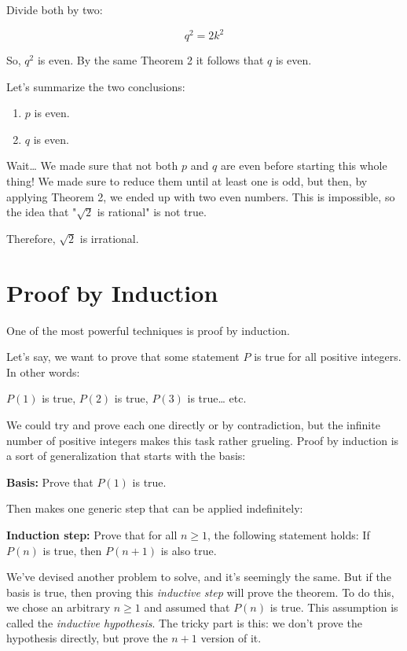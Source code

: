 \documentclass[12pt, a4paper, justified, notitlepage, sfsidenotes, notoc]{book}
\begin{document}
Divide both by two:

$$ q^2 = 2k^2 $$

So, \(q^2\) is even. By the same Theorem 2 it follows that \(q\) is even.

Let's summarize the two conclusions:

\begin{enumerate}
\item \(p\) is even.
\item \(q\) is even.
\end{enumerate}

Wait\ldots{} We made sure that not both \(p\) and \(q\) are even before starting this whole thing! We made sure to reduce them until at least one is odd, but then, by applying Theorem 2, we ended up with two even numbers. This is impossible, so the idea that "\(\sqrt{2}\) is rational" is not true.

Therefore, \(\sqrt{2}\) is irrational.

\section{Proof by Induction}
\label{sec:orgfa77e48}

One of the most powerful techniques is proof by induction.


Let's say, we want to prove that some statement \(P\) is true for all positive integers. In other words:

\(P(1)\) is true, \(P(2)\) is true, \(P(3)\) is true\ldots{} etc.

We could try and prove each one directly or by contradiction, but the infinite number of positive integers makes this task rather grueling. Proof by induction is a sort of generalization that starts with the basis:

\textbf{Basis:} Prove that \(P(1)\) is true.

Then makes one generic step that can be applied indefinitely:

\textbf{Induction step:} Prove that for all \(n\geq1\), the following statement holds: If \(P(n)\) is true, then \(P(n+1)\) is also true.

We've devised another problem to solve, and it's seemingly the same. But if the basis is true, then proving this \emph{inductive step} will prove the theorem. To do this, we chose an arbitrary \(n\geq1\) and assumed that \(P(n)\) is true. This assumption is called the \emph{inductive hypothesis}. The tricky part is this: we don't prove the hypothesis directly, but prove the \(n+1\) version of it.
\end{document}
